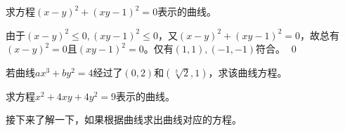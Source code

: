 \begin{example}
    求方程\((x-y)^2+(xy-1)^2=0\)表示的曲线。
\end{example}
\begin{jie}
    由于\((x-y)^2\leq 0,(xy-1)^2\leq 0\)，又\((x-y)^2+(xy-1)^2=0\)，故总有
    \((x-y)^2=0\)且\((xy-1)^2=0\)。仅有\((1,1),(-1,-1)\)符合。
    \qed
\end{jie}
\begin{exercise}
    若曲线\(ax^3+by^2=4\)经过了\((0,2)\)和\((\sqrt[3]{2},1)\)，求该曲线方程。
\end{exercise}
\begin{exercise}
    求方程\(x^2+4xy+4y^2=9\)表示的曲线。
\end{exercise}

接下来了解一下，如果根据曲线求出曲线对应的方程。

